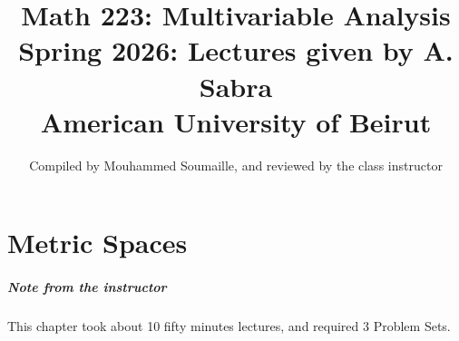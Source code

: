 \documentclass[11pt,openany]{book}
\theoremstyle{plain}
\theoremstyle{definition}
\theoremstyle{remark}
\begin{document}
\frontmatter
\title{Math 223: Multivariable Analysis\\
Spring 2026: Lectures given by A. Sabra \\ American University of Beirut}
\author{Compiled by Mouhammed Soumaille, and reviewed by the class instructor}
\date{}
\maketitle
\tableofcontents

\mainmatter


\chapter{Metric Spaces}
\paragraph{\bf  Note from the instructor}
This chapter took about 10 fifty minutes lectures, and required 3 Problem Sets.
\end{document}
